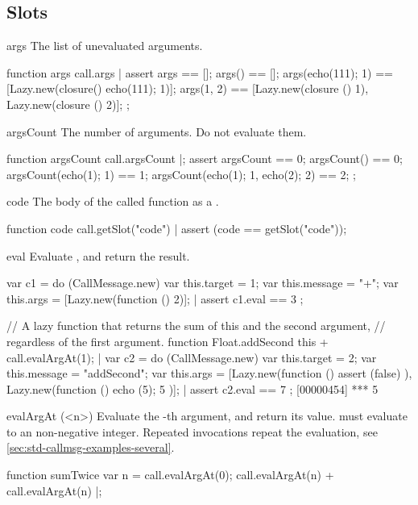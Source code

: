 \subsection{Slots}

\begin{urbiscriptapi}
\item[args]
  The list of unevaluated arguments.
\begin{urbiscript}
function args { call.args }|
assert
{
  args == [];
  args() == [];
  args({echo(111); 1}) == [Lazy.new(closure() {echo(111); 1})];
  args(1, 2) == [Lazy.new(closure () {1}),
                 Lazy.new(closure () {2})];
};
\end{urbiscript}


\item[argsCount]
  The number of arguments.  Do not evaluate them.
\begin{urbiscript}
function argsCount { call.argsCount }|;
assert
{
  argsCount == 0;
  argsCount() == 0;
  argsCount({echo(1); 1}) == 1;
  argsCount({echo(1); 1}, {echo(2); 2}) == 2;
};
\end{urbiscript}

\item[code]
  The body of the called function as a .
\begin{urbiscript}
function code { call.getSlot("code") }|
assert (code == getSlot("code"));
\end{urbiscript}

\item[eval] Evaluate \this, and return the result.
\begin{urbiscript}
var c1 = do (CallMessage.new)
{
  var this.target = 1;
  var this.message = "+";
  var this.args = [Lazy.new(function () {2})];
}|
assert { c1.eval == 3 };

// A lazy function that returns the sum of this and the second argument,
// regardless of the first argument.
function Float.addSecond
{
  this + call.evalArgAt(1);
}|
var c2 = do (CallMessage.new)
{
  var this.target = 2;
  var this.message = "addSecond";
  var this.args = [Lazy.new(function (){ assert (false) }),
                   Lazy.new(function (){ echo (5); 5 })];
}|
assert { c2.eval == 7 };
[00000454] *** 5
\end{urbiscript}

\item[evalArgAt](<n>)%
  Evaluate the -th argument, and return its value.  
  must evaluate to an non-negative integer.  Repeated invocations
  repeat the evaluation, see
  \autoref{sec:std-callmsg-examples-several}.
\begin{urbiscript}
function sumTwice
{
  var n = call.evalArgAt(0);
  call.evalArgAt(n) + call.evalArgAt(n)
}|;


\end{urbiscript}
\end{urbiscriptapi}
